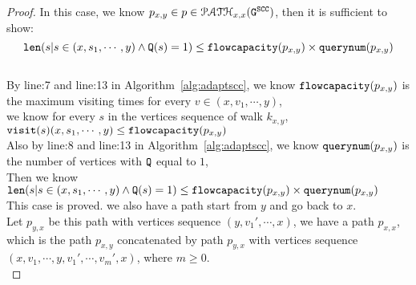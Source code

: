 \begin{proof}
  In this case, we know $p_{x, y} \in p \in \mathcal{PATH}_{x,x}(\mathtt{G^{SCC}})$,  then it is sufficient to show: 
  $$ 
  \mathtt{len}(s | s \in (x, s_1, \cdots, y) \land \mathtt{Q}(s) = 1) \leq \mathtt{flowcapacity}(p_{x, y}) \times \mathtt{querynum}(p_{x, y} ) 
  $$
  \\
By line:7 and line:13 in Algorithm~\ref{alg:adaptscc}, we know $\mathtt{flowcapacity}(p_{x, y})$ is the maximum visiting times for every $v \in (x, v_1, \cdots, y)$, 
\\
we know for every $s$ in the vertices sequence of walk $k_{x,y}$, 
$\mathtt{visit}(s) (x, s_1, \cdots, y)  \leq \mathtt{flowcapacity}(p_{x, y})$
  \\
  Also by line:8 and line:13 in Algorithm~\ref{alg:adaptscc}, we know $\mathtt{querynum}(p_{x, y})$ is the number of vertices with $\mathtt{Q}$ equal to $1$,
  \\
  Then we know 
  \\
  $\mathtt{len}(s | s \in (x, s_1, \cdots, y) \land \mathtt{Q}(s) = 1) \leq \mathtt{flowcapacity}(p_{x, y}) \times \mathtt{querynum}(p_{x, y}) $
  \\
  This case is proved.
  we also have a path start from $y$ and go back to $x$.
  \\
  Let $p_{y, x}$ be this path with vertices sequence $(y, v_1', \cdots, x)$, we have a path $p_{x,x}$, which is the path $p_{x, y}$ concatenated by path $p_{y, x}$ with vertices sequence $ (x, v_1, \cdots, y, v_1', \cdots, v_{m}', x)$, where $m \geq 0$.
  \\

\end{proof}
